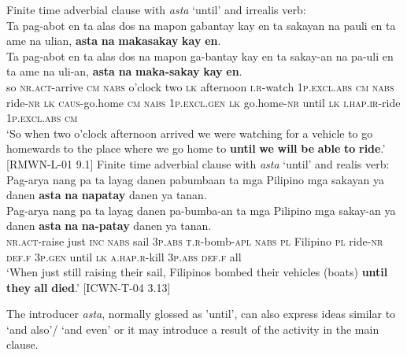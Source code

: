 \largerpage
\ea
Finite time adverbial clause with \textit{asta} ‘until’ and irrealis verb: \\
Ta  pag-abot  en  ta  alas  dos  na  mapon  gabantay kay  en  ta  sakayan  na  pauli  en  ta  ame na  ulian,  \textbf{asta}  \textbf{na}  \textbf{makasakay}  \textbf{kay}  \textbf{en}. \smallskip\\
\gll Ta  pag-abot  en  ta  alas  dos  na  mapon  ga-bantay kay  en  ta  sakay-an  na  pa-uli  en  ta  ame na  uli-an,  \textbf{asta}  \textbf{na}  \textbf{maka-sakay}  \textbf{kay}  \textbf{en}. \\
so  \textsc{nr.act}-arrive  \textsc{cm}  \textsc{nabs}  o’clock  two  \textsc{lk}  afternoon  \textsc{i.r}-watch
1\textsc{p.excl.abs}  \textsc{cm}  \textsc{nabs}  ride-\textsc{nr}  \textsc{lk}  \textsc{caus}-go.home  \textsc{cm}  \textsc{nabs}  1\textsc{p.excl.gen}
\textsc{lk}  go.home-\textsc{nr}  until  \textsc{lk}  \textsc{i.hap.ir}-ride  1\textsc{p.excl.abs}  \textsc{cm} \\
\glt `So when two o’clock afternoon arrived we were watching for a vehicle to go homewards to the place where we go home to \textbf{until} \textbf{we} \textbf{will} \textbf{be} \textbf{able} \textbf{to} \textbf{ride}.’ [RMWN-L-01 9.1]
\z
\ea
Finite time adverbial clause with \textit{asta} ‘until’ and realis verb: \\
Pag-arya  nang  pa  ta  layag  danen  pabumbaan  ta  mga Pilipino  mga  sakayan  ya  danen  \textbf{asta}  \textbf{na}  \textbf{napatay}  danen  ya  tanan. \smallskip\\
\gll Pag-arya  nang  pa  ta  layag  danen  pa-bumba-an  ta  mga Pilipino  mga  sakay-an  ya  danen  \textbf{asta}  \textbf{na}  \textbf{na-patay}  danen  ya  tanan. \\
\textsc{nr.act}-raise  just  \textsc{inc}  \textsc{nabs}  sail  3\textsc{p.abs}  \textsc{t.r}-bomb-\textsc{apl}  \textsc{nabs}  \textsc{pl}
Filipino  \textsc{pl}  ride-\textsc{nr}  \textsc{def.f}  3\textsc{p.gen}  until  \textsc{lk}  \textsc{a.hap.r}-kill  3\textsc{p.abs}  \textsc{def.f}  all \\
\glt `When just still raising their sail, Filipinos bombed their vehicles (boats) \textbf{until} \textbf{they} \textbf{all} \textbf{died}.’ [ICWN-T-04 3.13]
\z

The introducer \textit{asta}, normally glossed as 'until', can also express ideas similar to ‘and also’/ ‘and even’ or it may introduce a result of the activity in the main clause.

